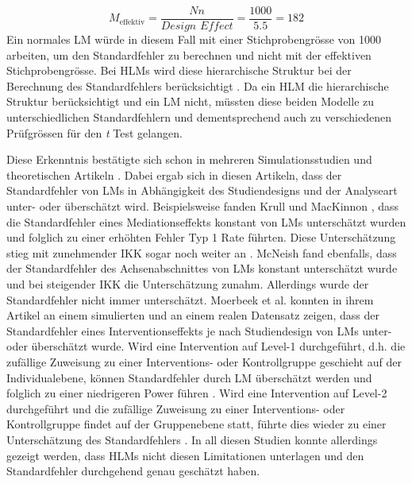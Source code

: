 \documentclass[12pt, a4paper]{article}\usepackage[]{graphicx}\usepackage[]{color}
\begin{document}
\begin{equation}
M_{\text{effektiv}} = \frac{Nn}{\textit{Design Effect}} = \frac{1000}{5.5} = 182
\end{equation}
Ein normales LM würde in diesem Fall mit einer Stichprobengrösse von 1000 arbeiten, um den Standardfehler zu berechnen und nicht mit der effektiven Stichprobengrösse. Bei HLMs wird diese hierarchische Struktur bei der Berechnung des Standardfehlers berücksichtigt \citep{snijdersbosker1993SEcalc}. Da ein HLM die hierarchische Struktur berücksichtigt und ein LM nicht, müssten diese beiden Modelle zu unterschiedlichen Standardfehlern und dementsprechend auch zu verschiedenen Prüfgrössen für den \textit{t} Test gelangen. 

Diese Erkenntnis bestätigte sich schon in mehreren Simulationsstudien und theoretischen Artikeln \citep[z.B.][]{guo2005groupeddatahlm, krullmackinnon2010mediation, mcneish2014analyzing, MOERBEEK2003341}. Dabei ergab sich in diesen Artikeln, dass der Standardfehler von LMs in Abhängigkeit des Studiendesigns und der Analyseart unter- oder überschätzt wird. Beispielsweise fanden Krull und MacKinnon \citeyearpar{krullmackinnon2010mediation}, dass die Standardfehler eines Mediationseffekts konstant von LMs unterschätzt wurden und folglich zu einer erhöhten Fehler Typ 1 Rate führten. Diese Unterschätzung stieg mit zunehmender IKK sogar noch weiter an \citep{krullmackinnon2010mediation}. McNeish \citeyearpar{mcneish2014analyzing} fand ebenfalls, dass der Standardfehler des Achsenabschnittes von LMs konstant unterschätzt wurde und bei steigender IKK die Unterschätzung zunahm. Allerdings wurde der Standardfehler nicht immer unterschätzt. Moerbeek et al. \citeyearpar{MOERBEEK2003341} konnten in ihrem Artikel an einem simulierten und an einem realen Datensatz zeigen, dass der Standardfehler eines Interventionseffekts je nach Studiendesign von LMs unter- oder überschätzt wurde. Wird eine Intervention auf Level-1 durchgeführt, d.h. die zufällige Zuweisung zu einer Interventions- oder Kontrollgruppe geschieht auf der Individualebene, können Standardfehler durch LM überschätzt werden und folglich zu einer niedrigeren Power führen \citep{MOERBEEK2003341}. Wird eine Intervention auf Level-2 durchgeführt und die zufällige Zuweisung zu einer Interventions- oder Kontrollgruppe findet auf der Gruppenebene statt, führte dies wieder zu einer Unterschätzung des Standardfehlers \citep{MOERBEEK2003341}. In all diesen Studien konnte allerdings gezeigt werden, dass HLMs nicht diesen Limitationen unterlagen und den Standardfehler durchgehend genau geschätzt haben.
\end{document}
